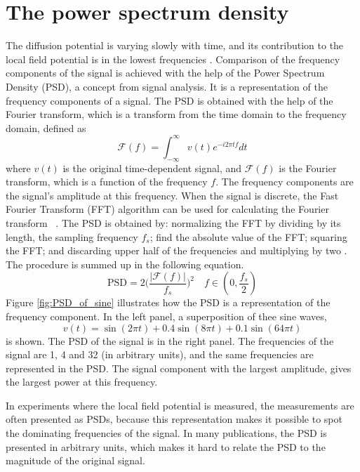 \documentclass{uiophd}
\begin{document}
\section{The power spectrum density}\label{PSD}
The diffusion potential is varying slowly with time, and its contribution to the local field potential is in the lowest frequencies \cite{Halnes2016}. Comparison of the frequency components of the signal is achieved with the help of the Power Spectrum Density (PSD), a concept from signal analysis. It is a representation of the frequency components of a signal. The PSD is obtained with the help of the Fourier transform, which is a transform from the time domain to the frequency domain, defined as
\begin{equation}
\mathcal{F}(f)=\int_{-\infty}^{\infty} v(t)e^{-i2\pi tf} dt
\end{equation}
where $v(t)$ is the original time-dependent signal, and $\mathcal{F}(f)$ is the Fourier transform, which is a function of the frequency $f$. The frequency components are the signal's amplitude at this frequency. When the signal is discrete, the Fast Fourier Transform (FFT) algorithm can be used for calculating the Fourier transform ~\cite{wikipediaFFT}. The PSD is obtained by: normalizing the FFT by dividing by its length, the sampling frequency $f_s$; find the absolute value of the FFT; squaring the FFT; and discarding upper half of the frequencies and multiplying by two \cite{PSDtutorial}. The procedure is summed up in the following equation.
\begin{equation}
\text{PSD} = 2\bigg(\frac{|\mathcal{F}(f)|}{f_s}\bigg)^2 \quad f \in (0,\frac{f_s}{2})
\end{equation}
Figure \ref{fig:PSD_of_sine} illustrates how the PSD is a representation of the frequency component. In the left panel, a superposition of thee sine waves, 
$$v(t) = \sin (2\pi t) + 0.4 \sin (8\pi t)+ 0.1 \sin (64\pi t)$$
is shown. The PSD of the signal is in the right panel. The frequencies of the signal are 1, 4 and 32 (in arbitrary units), and the same frequencies are represented in the PSD. The signal component with the largest amplitude, gives the largest power at this frequency.


In experiments where the local field potential is measured, the measurements are often presented as PSDs, because this representation makes it possible to spot the dominating frequencies of the signal. In many publications, the PSD is presented in arbitrary units, which makes it hard to relate the PSD to the magnitude of the original signal.
\end{document}
